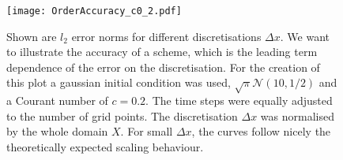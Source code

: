 \begin{figure}
\centering
\texttt{[image: OrderAccuracy\_c0\_2.pdf]}
\caption{Shown are $l_2$ error norms for different discretisations $\Delta x$. We want to illustrate the accuracy of a scheme, which is the leading term dependence of the error on the discretisation. For the creation of this plot a gaussian initial condition was used, $\sqrt{\pi}\mathcal{N}(10,1/2)$ and a Courant number of $c=0.2$. The time steps were equally adjusted to the number of grid points. The discretisation $\Delta x$ was normalised by the whole domain $X$. For small $\Delta x$, the curves follow nicely the theoretically expected scaling behaviour.}\label{fig:accuracy}
\end{figure}
\FloatBarrier
